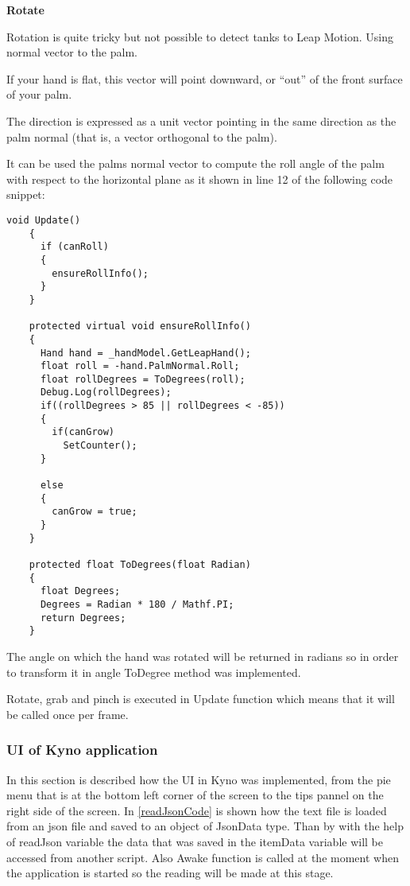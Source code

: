 {\textbf{Rotate}

Rotation is quite tricky but not possible to detect tanks to Leap Motion. Using normal vector to the palm.

If your hand is flat, this vector will point downward, or “out” of the front surface of your palm.

The direction is expressed as a unit vector pointing in the same direction as the palm normal (that is, a vector orthogonal to the palm).

It can be used the palms normal vector to compute the roll angle of the palm with respect to the horizontal plane as it shown in line 12 of the following  code snippet: 
\begin{lstlisting}[caption={Rotation detection in Kyno},label={createController}]
void Update()
    {
      if (canRoll)
      {
        ensureRollInfo();
      }
    }

    protected virtual void ensureRollInfo()
    {
      Hand hand = _handModel.GetLeapHand();
      float roll = -hand.PalmNormal.Roll;
      float rollDegrees = ToDegrees(roll);
      Debug.Log(rollDegrees);
      if((rollDegrees > 85 || rollDegrees < -85))
      {
        if(canGrow)
          SetCounter();
      }

      else
      {
        canGrow = true;
      }
    }

    protected float ToDegrees(float Radian)
    {
      float Degrees;
      Degrees = Radian * 180 / Mathf.PI;
      return Degrees;
    }
\end{lstlisting}
 
 The angle on which the hand was rotated will be returned in radians so in order to transform it in angle ToDegree method was implemented. 
 
 Rotate, grab and pinch is executed in Update function which means that it will be called once per frame.
 
 \subsubsection{UI of Kyno application}
  In this section is described how the UI in Kyno was implemented, from the pie menu that is at the bottom left corner of the screen to the tips pannel on the right side of the screen. In \autoref{readJsonCode} is shown how the text file is loaded from an json file and saved to an object of JsonData type. Than by with the help of readJson variable the data that was saved in the itemData variable will be accessed from another script. Also Awake function is called at the moment when the application is started so the reading will be made at this stage.
  
}

